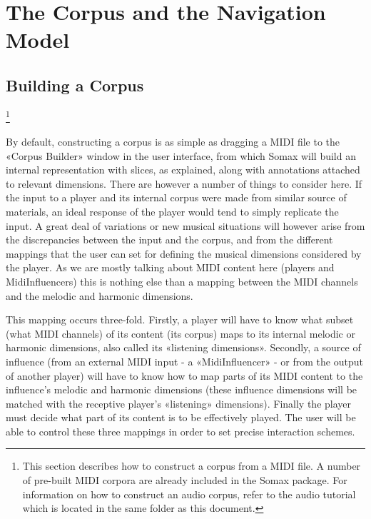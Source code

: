 \chapter{The Corpus and the Navigation Model}



\section{Building a  Corpus} \footnote{This section describes how to construct a corpus from a MIDI file. A number of pre-built MIDI corpora are already included in the Somax package. For information on how to construct an audio corpus, refer to the audio tutorial which is located in the same folder as this document.}

By default, constructing a corpus is as simple as dragging a MIDI file to the «Corpus Builder» window in the user interface, from which Somax will build an internal representation with slices, as explained, along with annotations attached to relevant dimensions. There are however a number of things to consider here. If the input to a player and its internal corpus were made from similar source of materials, an ideal response of the player would tend to simply replicate the input. A great deal of variations or new musical situations will however arise from the discrepancies between the input and the corpus, and from the different mappings that the user can set for defining the musical dimensions considered by the player. As we are mostly talking about MIDI content here (players and MidiInfluencers) this is nothing else than a mapping between the MIDI channels and the melodic and harmonic dimensions.

This mapping occurs three-fold. Firstly, a player will have to know what subset (what MIDI channels) of its content (its corpus) maps to its internal melodic or harmonic dimensions, also called its «listening dimensions». Secondly, a source of influence (from an external MIDI input - a «MidiInfluencer» - or from the output of another player) will have to know how to map parts of its MIDI content to the influence’s melodic and harmonic dimensions (these influence dimensions will be matched with the receptive player’s «listening» dimensions). Finally the player must decide what part of its content is to be effectively played. The user will be able to control these three mappings in order to set precise interaction schemes.

